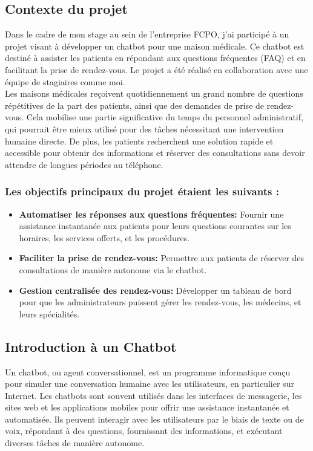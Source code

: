 \subsection{Contexte du projet}

\hspace{16pt}Dans le cadre de mon stage au sein de l'entreprise FCPO, j'ai participé à un projet visant à développer un chatbot pour une maison médicale. Ce chatbot est destiné à assister les patients en répondant aux questions fréquentes (FAQ) et en facilitant la prise de rendez-vous. Le projet a été réalisé en collaboration avec une équipe de stagiaires comme moi.\\

Les maisons médicales reçoivent quotidiennement un grand nombre de questions répétitives de la part des patients, ainsi que des demandes de prise de rendez-vous. Cela mobilise une partie significative du temps du personnel administratif, qui pourrait être mieux utilisé pour des tâches nécessitant une intervention humaine directe. De plus, les patients recherchent une solution rapide et accessible pour obtenir des informations et réserver des consultations sans devoir attendre de longues périodes au téléphone.\\

\subsubsection{Les objectifs principaux du projet étaient les suivants :}
\begin{itemize}
  \item \textbf{Automatiser les réponses aux questions fréquentes: }Fournir une assistance instantanée aux patients pour leurs questions courantes sur les horaires, les services offerts, et les procédures.
  \item \textbf{Faciliter la prise de rendez-vous: }Permettre aux patients de réserver des consultations de manière autonome via le chatbot.
  \item \textbf{Gestion centralisée des rendez-vous: }Développer un tableau de bord pour que les administrateurs puissent gérer les rendez-vous, les médecins, et leurs spécialités.
\end{itemize}

\subsection{Introduction à un Chatbot}

\hspace{16pt}Un chatbot, ou agent conversationnel, est un programme informatique conçu pour simuler une conversation humaine avec les utilisateurs, en particulier sur Internet. Les chatbots sont souvent utilisés dans les interfaces de messagerie, les sites web et les applications mobiles pour offrir une assistance instantanée et automatisée. Ils peuvent interagir avec les utilisateurs par le biais de texte ou de voix, répondant à des questions, fournissant des informations, et exécutant diverses tâches de manière autonome.

